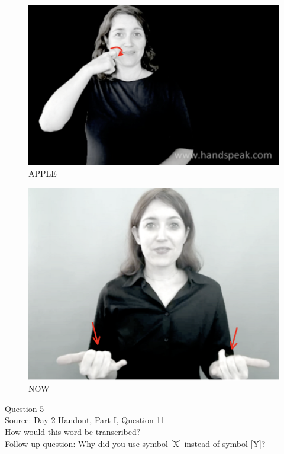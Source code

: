 \documentclass[12pt]{article}
\begin{document}
\begin{figure}[H]
\includegraphics{../images/asl_apple.png}
\caption{APPLE}
\end{figure}
\begin{figure}[H]
\includegraphics{../images/asl_now.png}
\caption{NOW}
\end{figure}

\newpage

{\large Question 5}\\

Source: Day 2 Handout, Part I, Question 11\\

How would this word be transcribed?\\ Follow-up question: Why did you use symbol [X] instead of symbol [Y]?\\
\end{document}
